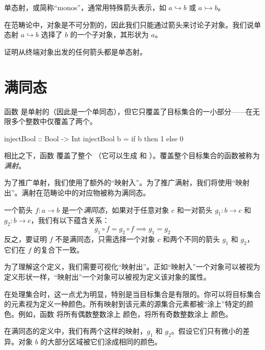 \documentclass[DaoFP]{subfiles}
\begin{document}
单态射，或简称“monos”，通常用特殊箭头表示，如 $a \hookrightarrow b$ 或 $a \rightarrowtail b$。

在范畴论中，对象是不可分割的，因此我们只能通过箭头来讨论子对象。我们说单态射 $a \hookrightarrow b$ 选择了 $b$ 的一个子对象，其形状为 $a$。

\begin{exercise}
证明从终端对象出发的任何箭头都是单态射。
\end{exercise}
\section{满同态}

函数  是单射的（因此是一个单同态），但它只覆盖了目标集合的一小部分——在无限多个整数中仅覆盖了两个。
\begin{haskell}
injectBool :: Bool -> Int
injectBool b = if b then 1 else 0
\end{haskell}
相比之下，函数  覆盖了整个 （它可以生成  和 ）。覆盖整个目标集合的函数被称为\emph{满射}。

为了推广单射，我们使用了额外的“映射入”。为了推广满射，我们将使用“映射出”。满射在范畴论中的对应物被称为满同态。

一个箭头 $f \colon a \to b$ 是一个\emph{满同态}，如果对于任意对象 $c$ 和一对箭头 $g_1 \colon b \to c$ 和 $g_2 \colon b \to c$，我们有以下蕴含关系：
\[ g_1 \circ f = g_2 \circ f \implies g_1 = g_2 \]
反之，要证明 $f$ 不是满同态，只需选择一个对象 $c$ 和两个不同的箭头 $g_1$ 和 $g_2$，它们在 $f$ 的复合下一致。

为了理解这个定义，我们需要可视化“映射出”。正如“映射入”一个对象可以被视为定义形状一样，“映射出”一个对象可以被视为定义该对象的属性。

在处理集合时，这一点尤为明显，特别是当目标集合是有限的。你可以将目标集合的元素视为定义一种颜色。所有映射到该元素的源集合元素都被“涂上”特定的颜色。例如，函数  将所有偶数整数涂上  颜色，将所有奇数整数涂上  颜色。

在满同态的定义中，我们有两个这样的映射，$g_1$ 和 $g_2$。假设它们只有微小的差异。对象 $b$ 的大部分区域被它们涂成相同的颜色。
\end{document}
